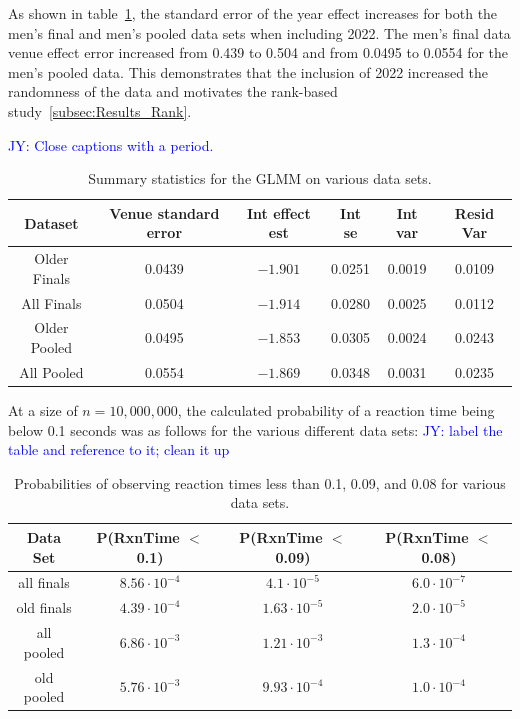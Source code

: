 \documentclass[12pt, letterpaper, titlepage]{article}
\newcommand{\jy}[1]{\textcolor{blue}{JY: #1}}
\begin{document}
As shown in table~\ref{tab:Gamma_parameters}, the standard error of the year
effect increases for both the men's final and men's pooled data sets when
including 2022.  The men's final data venue effect error increased from 0.439
to 0.504 and from 0.0495 to 0.0554 for the men's pooled data.  This demonstrates
that the inclusion of 2022 increased the randomness of the data and motivates
the rank-based study~\ref{subsec:Results_Rank}.

\jy{Close captions with a period.}
\begin{table}
  \centering
  \caption{Summary statistics for the GLMM on various data sets.}
  \begin{tabular}{c c c c c c}
      \toprule
      Dataset & Venue standard error & Int effect est & Int se & Int var & Resid Var \\
      \midrule
      Older Finals & 0.0439 & $-1.901$ & 0.0251 & 0.0019 & 0.0109 \\
      All Finals & 0.0504 & $-1.914$ & 0.0280 & 0.0025 & 0.0112 \\
      Older Pooled & 0.0495 & $-1.853$ & 0.0305 & 0.0024 & 0.0243 \\
      All Pooled & 0.0554 & $-1.869$ & 0.0348 & 0.0031 & 0.0235 \\
      \bottomrule
  \end{tabular}
  \label{tab:Gamma_parameters}
\end{table}

At a size of $n=10,000,000$, the calculated probability of a reaction
time being below 0.1 seconds was as follows for the various different data sets:
\jy{label the table and reference to it; clean it up}
\begin{table}
  \centering
  \caption{Probabilities of observing reaction times less than 0.1, 0.09, and
  0.08 for various data sets.}
  \begin{tabular}{c c c c} 
   \toprule
   Data Set & P(RxnTime $<$ 0.1) & P(RxnTime $<$ 0.09) & P(RxnTime $<$ 0.08) \\ 
   \midrule
   all finals & $8.56\cdot10^{-4}$ & $4.1\cdot10^{-5}$ & $6.0\cdot10^{-7}$ \\ 
   old finals & $4.39\cdot10^{-4}$ & $1.63\cdot10^{-5}$ & $2.0\cdot10^{-5}$ \\
   all pooled & $6.86\cdot10^{-3}$ & $1.21\cdot10^{-3}$ & $1.3\cdot10^{-4}$ \\
   old pooled & $5.76\cdot10^{-3}$ & $9.93\cdot10^{-4}$ & $1.0\cdot10^{-4}$\\
   \bottomrule
  \end{tabular}
  \label{tab:Sim_probability}
\end{table}
\end{document}
